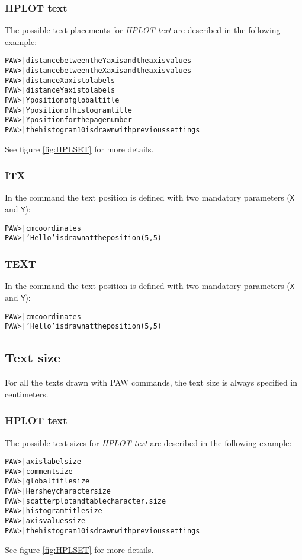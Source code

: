 \subsubsection{HPLOT text}
The possible text placements for {\em HPLOT text} are described in the
following example:
\begin{alltt}
PAW >  | distance between the Y axis and the axis values
PAW >  | distance between the X axis and the axis values
PAW >  | distance X axis to labels
PAW >  | distance Y axis to labels
PAW >  | Y position of global title
PAW >  | Y position  of histogram title
PAW >  | Y position for the page number
PAW >  | the histogram 10 is drawn with previous settings
\end{alltt}
See figure \ref{fig:HPLSET} for more details.
\subsubsection{ITX}
In the command  the text position is defined with two mandatory
parameters (\texttt{X} and \texttt{Y}): 
\begin{alltt}
PAW >          | cm coordinates
PAW >  | 'Hello' is drawn at the position (5,5)
\end{alltt}
\subsubsection{TEXT}
In the command  the text position is defined with two mandatory
parameters (\texttt{X} and \texttt{Y}): 
\begin{alltt}
PAW >             | cm coordinates
PAW >  | 'Hello' is drawn at the position (5,5)
\end{alltt}

\subsection*{Text size}
For all the texts drawn with PAW commands, the text size is always specified
in centimeters.
\subsubsection{HPLOT text}
The possible text sizes for {\em HPLOT text} are described in the
following example:
\begin{alltt}
PAW >  | axis label size
PAW >  | comment size
PAW >  | global title size
PAW >  | Hershey character size
PAW >  | scatter plot and table character. size
PAW >  | histogram title size
PAW >  | axis values size
PAW >  | the histogram 10 is drawn with previous settings
\end{alltt}
See figure \ref{fig:HPLSET} for more details.
